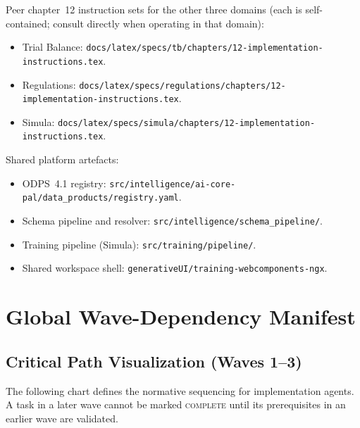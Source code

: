 \documentclass[11pt,a4paper,twoside]{report}
\begin{document}
Peer chapter~12 instruction sets for the other three domains (each
is self-contained; consult directly when operating in that domain):
\begin{itemize}
\item Trial Balance:
\texttt{docs/latex/specs/tb/chapters/12-implementation-instructions.tex}.
\item Regulations:
\texttt{docs/latex/specs/regulations/chapters/12-implementation-instructions.tex}.
\item Simula:
\texttt{docs/latex/specs/simula/chapters/12-implementation-instructions.tex}.
\end{itemize}

Shared platform artefacts:
\begin{itemize}
\item ODPS~4.1 registry:
\texttt{src/intelligence/ai-core-pal/data\_products/registry.yaml}.
\item Schema pipeline and resolver:
\texttt{src/intelligence/schema\_pipeline/}.
\item Training pipeline (Simula):
\texttt{src/training/pipeline/}.
\item Shared workspace shell:
\texttt{generativeUI/training-webcomponents-ngx}.
\end{itemize}

\chapter{Global Wave-Dependency Manifest}
\label{ch:global-dependencies}

\section{Critical Path Visualization (Waves 1--3)}
The following chart defines the normative sequencing for implementation agents. A task in a later wave cannot be marked \textsc{complete} until its prerequisites in an earlier wave are validated.
\end{document}
